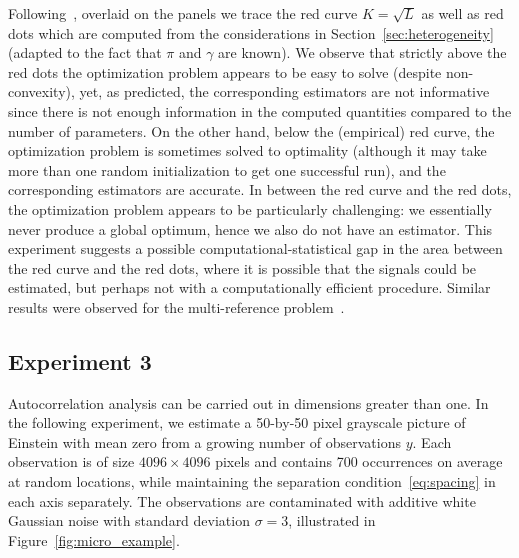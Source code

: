 \documentclass[12pt]{article}
\newcommand{\1}{\mathbf{1}}
\theoremstyle{plain}
\theoremstyle{definition}
\theoremstyle{remark}
\theoremstyle{plain}
\theoremstyle{remark}
\theoremstyle{plain}
\theoremstyle{plain}
\theoremstyle{plain}
\numberwithin{equation}{section}
\begin{document}
Following~\cite{boumal2017heterogeneous}, overlaid on the panels we trace the red curve $K = \sqrt{L}$ as well as red dots which are computed from the considerations in Section~\ref{sec:heterogeneity} (adapted to the fact that $\pi$ and $\gamma$ are known). We observe that strictly above the red dots the optimization problem appears to be easy to solve (despite non-convexity), yet, as predicted, the corresponding estimators are not informative since there is not enough information in the computed quantities compared to the number of parameters. On the other hand, below the (empirical) red curve, the optimization problem is sometimes solved to optimality (although it may take more than one random initialization to get one successful run), and the corresponding estimators are accurate. In between the red curve and the red dots, the optimization problem appears to be particularly challenging: we essentially never produce a global optimum, hence we also do not have an estimator. This experiment suggests a possible computational-statistical gap in the area between the red curve and the red dots, where it is possible that the signals could be estimated, but perhaps not with a computationally efficient procedure.
Similar results were observed for the multi-reference problem~\cite{boumal2017heterogeneous,weinthesis,bandeira2017estimation}.

\subsection{Experiment 3}

Autocorrelation analysis can be carried out in dimensions greater than one. In the following experiment, we estimate 
a 50-by-50 pixel grayscale picture of Einstein with mean zero from a growing number of observations $y$. Each observation is of size $4096\times 4096$ pixels and contains 700 occurrences on average at random locations, while maintaining the separation condition~\eqref{eq:spacing} in each axis separately.
The observations are contaminated with additive white Gaussian noise with standard deviation $\sigma = 3$, illustrated in Figure~\ref{fig:micro_example}. 
\end{document}
